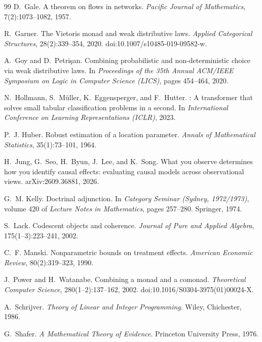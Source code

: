 \documentclass[11pt]{article}
\theoremstyle{definition}
\theoremstyle{remark}
\begin{document}
\begin{thebibliography}{99}
D.~Gale.
\newblock A theorem on flows in networks.
\newblock \emph{Pacific Journal of Mathematics}, 7(2):1073--1082, 1957.

R.~Garner.
\newblock The {V}ietoris monad and weak distributive laws.
\newblock \emph{Applied Categorical Structures}, 28(2):339--354, 2020.
\newblock doi:10.1007/s10485-019-09582-w.

A.~Goy and D.~Petri\c{s}an.
\newblock Combining probabilistic and non-deterministic choice via weak distributive laws.
\newblock In \emph{Proceedings of the 35th Annual ACM/IEEE Symposium on Logic in Computer Science
  (LICS)}, pages 454--464, 2020.

N.~Hollmann, S.~M\"uller, K.~Eggensperger, and F.~Hutter.
: A transformer that solves small tabular classification problems in a second.
\newblock In \emph{International Conference on Learning Representations (ICLR)}, 2023.

P.~J. Huber.
\newblock Robust estimation of a location parameter.
\newblock \emph{Annals of Mathematical Statistics}, 35(1):73--101, 1964.

H.~Jung, G.~Seo, H.~Byun, J.~Lee, and K.~Song.
\newblock What you observe determines how you identify causal effects: evaluating causal models
  across observational views.
\newblock arXiv:2609.36881, 2026.

G.~M. Kelly.
\newblock Doctrinal adjunction.
\newblock In \emph{Category Seminar (Sydney, 1972/1973)}, volume 420 of \emph{Lecture Notes in
  Mathematics}, pages 257--280. Springer, 1974.

S.~Lack.
\newblock Codescent objects and coherence.
\newblock \emph{Journal of Pure and Applied Algebra}, 175(1--3):223--241, 2002.

C.~F. Manski.
\newblock Nonparametric bounds on treatment effects.
\newblock \emph{American Economic Review}, 80(2):319--323, 1990.

J.~Power and H.~Watanabe.
\newblock Combining a monad and a comonad.
\newblock \emph{Theoretical Computer Science}, 280(1--2):137--162, 2002.
\newblock doi:10.1016/S0304-3975(01)00024-X.

A.~Schrijver.
\newblock \emph{Theory of Linear and Integer Programming}.
\newblock Wiley, Chichester, 1986.

G.~Shafer.
\newblock \emph{A Mathematical Theory of Evidence}.
\newblock Princeton University Press, 1976.


\end{thebibliography}
\end{document}
